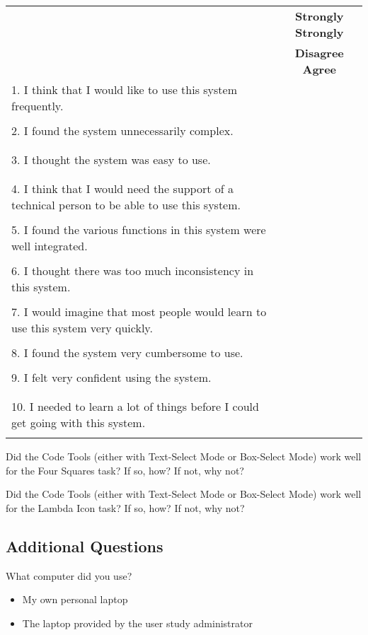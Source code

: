 \newcommand{\likertBox}[1]{\framebox[0.50in][c]{#1}}
\newcommand{\likertOptions}
  {\likertBox{1}\likertBox{2}\likertBox{3}\likertBox{4}\likertBox{5}}
\newcommand{\susQuestion}[1]{#1 & \likertOptions \\\\}

\begin{tabular}{p{3.0in}c}
\renewcommand{\arraystretch}{3.0}
& \textbf{Strongly} \hfill \textbf{Strongly} \\
& \textbf{Disagree} \hfill \textbf{Agree} \\[20pt]
\susQuestion{1. I think that I would like to use this system frequently.}
\susQuestion{2. I found the system unnecessarily complex.} \\
\susQuestion{3. I thought the system was easy to use.} \\
\susQuestion{4. I think that I would need the support of a technical person to be able to use this system.}
\susQuestion{5. I found the various functions in this system were well integrated.}
\susQuestion{6. I thought there was too much inconsistency in this system.}
\susQuestion{7. I would imagine that most people would learn to use this system very quickly.}
\susQuestion{8. I found the system very cumbersome to use.}
\susQuestion{9. I felt very confident using the system.} \\
\susQuestion{10. I needed to learn a lot of things before I could get going with this system.}
\end{tabular}



\newcommand{\fullmodequestion}[1]{

Did the Code Tools (either with Text-Select Mode
or Box-Select Mode) work well for the {#1} task?
If so, how? If not, why not?

}

\fullmodequestion{Four Squares}


\fullmodequestion{Lambda Icon}



\subsection*{Additional Questions}

What computer did you use?

\begin{itemize}
  \item My own personal laptop
  \item The laptop provided by the user study administrator
\end{itemize}

